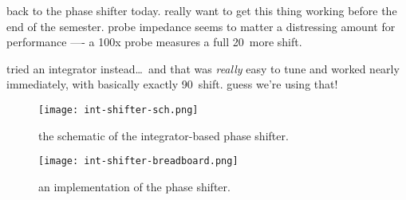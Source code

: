 back to the phase shifter today. really want to get this thing working before
the end of the semester. probe impedance seems to matter a distressing amount
for performance —- a 100x probe measures a full 20\textdegree\ more shift.

tried an integrator instead\ldots\ and that was \emph{really} easy to tune and
worked nearly immediately, with basically exactly 90\textdegree\ shift. guess
we're using that!

\begin{figure}[H]
	\centering
	\texttt{[image: int-shifter-sch.png]}
	\caption{the schematic of the integrator-based phase shifter.}
\end{figure}

\begin{figure}[H]
	\centering
	\texttt{[image: int-shifter-breadboard.png]}
	\caption{an implementation of the phase shifter.}
\end{figure}
